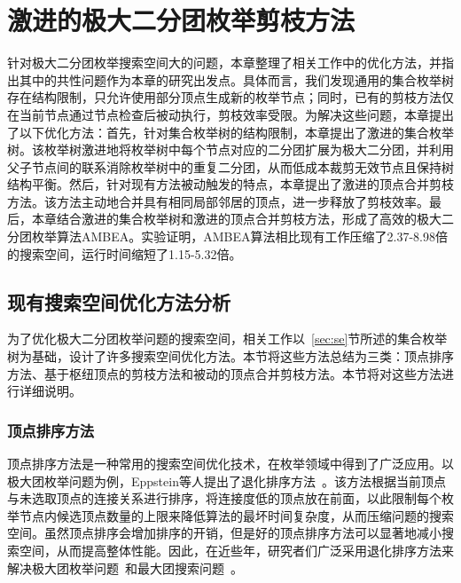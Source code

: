 \chapter{激进的极大二分团枚举剪枝方法}
\label{ch:aggressive_mbe}

针对极大二分团枚举搜索空间大的问题，本章整理了相关工作中的优化方法，并指出其中的共性问题作为本章的研究出发点。具体而言，我们发现通用的集合枚举树存在结构限制，只允许使用部分顶点生成新的枚举节点；同时，已有的剪枝方法仅在当前节点通过节点检查后被动执行，剪枝效率受限。为解决这些问题，本章提出了以下优化方法：首先，针对集合枚举树的结构限制，本章提出了激进的集合枚举树。该枚举树激进地将枚举树中每个节点对应的二分团扩展为极大二分团，并利用父子节点间的联系消除枚举树中的重复二分团，从而低成本裁剪无效节点且保持树结构平衡。然后，针对现有方法被动触发的特点，本章提出了激进的顶点合并剪枝方法。该方法主动地合并具有相同局部邻居的顶点，进一步释放了剪枝效率。最后，本章结合激进的集合枚举树和激进的顶点合并剪枝方法，形成了高效的极大二分团枚举算法AMBEA。实验证明，AMBEA算法相比现有工作压缩了2.37-8.98倍的搜索空间，运行时间缩短了1.15-5.32倍。

\section{现有搜索空间优化方法分析}
\label{sec:opt}

为了优化极大二分团枚举问题的搜索空间，相关工作以~\ref{sec:se}节所述的集合枚举树为基础，设计了许多搜索空间优化方法。本节将这些方法总结为三类：顶点排序方法、基于枢纽顶点的剪枝方法和被动的顶点合并剪枝方法。本节将对这些方法进行详细说明。

\subsection{顶点排序方法}
\label{subsec:order}

顶点排序方法是一种常用的搜索空间优化技术，在枚举领域中得到了广泛应用。以极大团枚举问题为例，Eppstein等人提出了退化排序方法~\cite{MCEdegeneracy10}。该方法根据当前顶点与未选取顶点的连接关系进行排序，将连接度低的顶点放在前面，以此限制每个枚举节点内候选顶点数量的上限来降低算法的最坏时间复杂度，从而压缩问题的搜索空间。虽然顶点排序会增加排序的开销，但是好的顶点排序方法可以显著地减小搜索空间，从而提高整体性能。因此，在近些年，研究者们广泛采用退化排序方法来解决极大团枚举问题~\cite{MCEparallel20,MCE20,MCE22,MCE-GPU21,MCE-22}和最大团搜索问题~\cite{MEC20,MEC22}。




